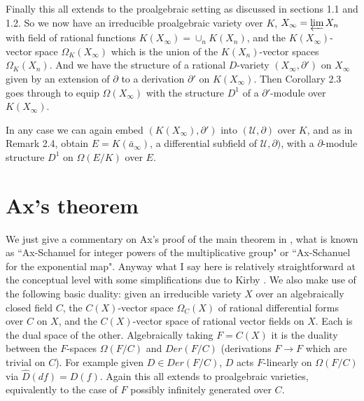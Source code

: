 \documentclass[12pt]{article}
\begin{document}
Finally this all extends to the proalgebraic setting  as discussed in sections 1.1 and 1.2.  So we now have an irreducible proalgebraic variety over $K$, $X_{\infty} = \varprojlim X_{n}$ with field of rational functions $K(X_{\infty}) 
=\cup_{n}K(X_{n})$, and  the $K(X_{\infty})$-vector space  $\Omega_{K}(X_{\infty})$ which is the union of the $K(X_{n})$-vector spaces $\Omega_{K}(X_{n})$. And we have the structure of a rational $D$-variety $(X_{\infty},\partial ')$ on 
$X_{\infty}$ given by an extension of $\partial$ to a derivation $\partial '$ on $K(X_{\infty})$.  Then Corollary 2.3  goes through to equip $\Omega(X_{\infty})$ with the structure $D^{1}$ of a $\partial '$-module over $K(X_{\infty})$.


In any case  we can again embed  $(K(X_{\infty}), \partial ')$ into $({\mathcal U}, \partial)$ over $K$, and as in Remark 2.4, obtain $E = K({\bar a}_{\infty})$, a differential subfield of ${\mathcal U},\partial)$, with a $\partial$-module structure $D^{1}$ on $\Omega(E/K)$ over $E$. 

\section{Ax's theorem} 
We just give a commentary on Ax's proof of the main theorem in \cite{Ax}, what is known as ``Ax-Schanuel for integer powers of the multiplicative group" or ``Ax-Schanuel for the exponential map". 
Anyway what I say here is relatively straightforward at the conceptual level with some simplifications due to Kirby \cite{Kirby}.  We also make use of the following basic duality: given an  irreducible variety $X$ over an algebraically closed field $C$, the $C(X)$-vector space $\Omega_{C}(X)$ of rational differential forms over $C$ on $X$, and the $C(X)$-vector space of rational vector fields on $X$.  Each is the dual space of the other. Algebraically taking $F = C(X)$ it is the duality between the $F$-spaces $\Omega(F/C)$ and $Der(F/C)$ (derivations $F\to F$ which are trivial on $C$).  For example given $D\in Der(F/C)$, $D$ acts $F$-linearly on $\Omega(F/C)$ via ${\hat D}(df) = D(f)$. Again this all extends to proalgebraic varieties, equivalently to the case of $F$ possibly infinitely generated over $C$. 
\end{document}
